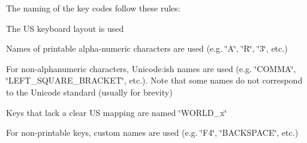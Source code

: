 The naming of the key codes follow these rules\+:
\begin{DoxyItemize}
\item The U\+S keyboard layout is used
\item Names of printable alpha-\/numeric characters are used (e.\+g. \char`\"{}\+A\char`\"{}, \char`\"{}\+R\char`\"{}, \char`\"{}3\char`\"{}, etc.)
\item For non-\/alphanumeric characters, Unicode\+:ish names are used (e.\+g. \char`\"{}\+C\+O\+M\+M\+A\char`\"{}, \char`\"{}\+L\+E\+F\+T\+\_\+\+S\+Q\+U\+A\+R\+E\+\_\+\+B\+R\+A\+C\+K\+E\+T\char`\"{}, etc.). Note that some names do not correspond to the Unicode standard (usually for brevity)
\item Keys that lack a clear U\+S mapping are named \char`\"{}\+W\+O\+R\+L\+D\+\_\+x\char`\"{}
\item For non-\/printable keys, custom names are used (e.\+g. \char`\"{}\+F4\char`\"{}, \char`\"{}\+B\+A\+C\+K\+S\+P\+A\+C\+E\char`\"{}, etc.) 
\end{DoxyItemize}